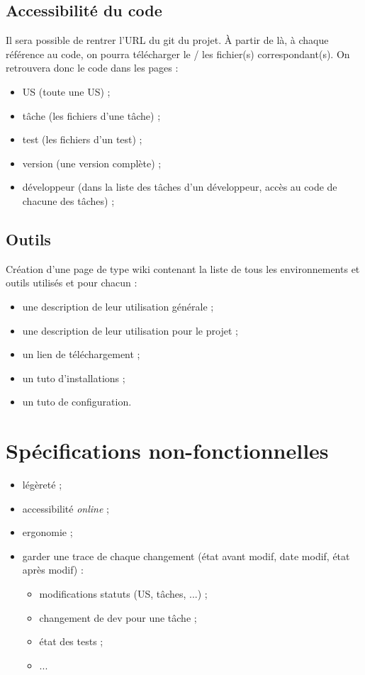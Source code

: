\subsection{Accessibilit\'e du code}
Il sera possible de rentrer l'URL du git du projet. \`A partir de l\`a, \`a chaque r\'ef\'erence au code, on pourra t\'el\'echarger le / les fichier(s) correspondant(s). On retrouvera donc le code dans les pages :
\begin{itemize}
\item US (toute une US) ;
\item t\^ache (les fichiers d'une t\^ache) ;
\item test (les fichiers d'un test) ;
\item version (une version compl\`ete) ;
\item d\'eveloppeur (dans la liste des t\^aches d'un d\'eveloppeur, acc\`es au code de chacune des t\^aches) ;
\end{itemize}

\subsection{Outils}
Cr\'eation d'une page de type wiki contenant la liste de tous les environnements et outils utilis\'es et pour chacun :
\begin{itemize}
\item une description de leur utilisation g\'en\'erale ;
\item une description de leur utilisation pour le projet ;
\item un lien de t\'el\'echargement ;
\item un tuto d'installations ;
\item un tuto de configuration.
\end{itemize}

\section{Sp\'ecifications non-fonctionnelles}
\begin{itemize}
\item l\'eg\`eret\'e ;
\item accessibilit\'e \textit{online} ;
\item ergonomie ;
\item garder une trace de chaque changement (\'etat avant modif, date modif, \'etat apr\`es modif) :
\begin{itemize}
\item modifications statuts (US, t\^aches, ...) ;
\item changement de dev pour une t\^ache ;
\item \'etat des tests ;
\item ...
\end{itemize}
\end{itemize}